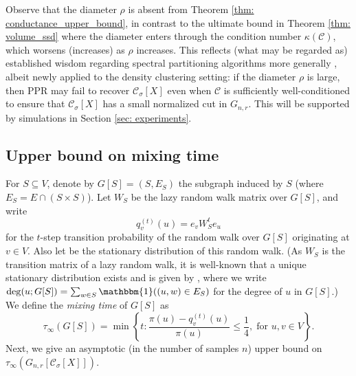 \documentclass[11pt,twoside]{article}
\newcommand{\set}[1]{\left\{#1\right\}}
\newcommand{\vol}{\mathrm{vol}}
\newcommand{\1}{\mathbbm{1}}
\newcommand{\Xbf}{X}
\newcommand{\Wbf}{W}
\newcommand{\Cset}{\mathcal{C}}
\newcommand{\Csig}{\Cset_{\sigma}}
\begin{document}
\begin{remark}
  Observe that the diameter $\rho$ is absent from Theorem \ref{thm:
    conductance_upper_bound}, in contrast to the ultimate bound in Theorem    
  \ref{thm: volume_ssd} where the diameter enters through the condition number 
  $\kappa(\Cset)$, which worsens (increases) as $\rho$ increases. This reflects
  (what may be regarded as) established wisdom regarding spectral partitioning
  algorithms more generally \citep{guattery1995, hein2010}, albeit newly applied
  to the density clustering setting: if the diameter $\rho$ is large, then PPR
  may fail to recover $\Csig[\Xbf]$ even when $\Cset$ is sufficiently
  well-conditioned to ensure that $\Csig[\Xbf]$ has a small normalized cut in 
  $G_{n,r}$. This will be supported by simulations in Section \ref{sec:
    experiments}.   
\end{remark}

\subsection{Upper bound on mixing time} 

For $S \subseteq V$, denote by $G[S] = (S, E_S)$ the
subgraph induced by $S$ (where $E_S = E \cap (S \times S)$). Let 
$\Wbf_S$ be the lazy random walk matrix over $G[S]$, and write  
$$
q_{v}^{(t)}(u) = e_v\Wbf_S^t e_u
$$
for the $t$-step transition probability of the random walk over $G[S]$
originating at $v \in V$. Also let  be 
the stationary distribution of this random walk. (As $\Wbf_S$ is the transition 
matrix of a lazy random walk, it is well-known that a unique stationary
distribution exists and is given by  \smash{$\pi(u) = \deg(u;G[S])/\vol(S;
  G[S])$}, where we write $\deg(u;G[S]) = \sum_{w \in S} \1((u,w) \in E_S)$ for
the degree of $u$ in $G[S]$.) We define the \emph{mixing time} of $G[S]$ as 
\begin{equation}
\label{eqn: mixing_time}
\tau_{\infty}(G[S]) = \min\set{ t: \frac{\pi(u) - q_{v}^{(t)}(u)}
  {\pi(u)} \leq \frac{1}{4}, \; \text{for $u,v \in V$}}. 
\end{equation}
Next, we give an asymptotic (in the number of samples $n$) upper bound on
$\tau_{\infty}(G_{n,r}[\Csig[\Xbf]])$.  
\end{document}
